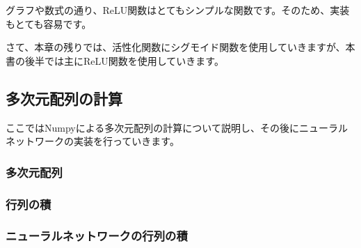 グラフや数式の通り、ReLU関数はとてもシンプルな関数です。そのため、実装もとても容易です。

さて、本章の残りでは、活性化関数にシグモイド関数を使用していきますが、本書の後半では主にReLU関数を使用していきます。

\subsection{多次元配列の計算}
ここではNumpyによる多次元配列の計算について説明し、その後にニューラルネットワークの実装を行っていきます。
\subsubsection{多次元配列}
\subsubsection{行列の積}
\subsubsection{ニューラルネットワークの行列の積}


